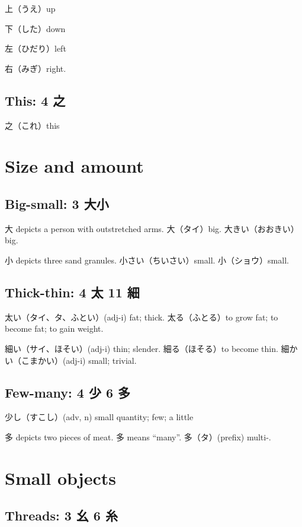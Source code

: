 上（うえ）up

下（した）down

左（ひだり）left

右（みぎ）right.

\subsection{This: 4 之}

之（これ）this

\section{Size and amount}

\subsection{Big-small: 3 大小}

大 depicts a person with outstretched arms.
大（タイ）big.
大きい（おおきい）big.

小 depicts three sand granules.
小さい（ちいさい）small.
小（ショウ）small.

\subsection{Thick-thin: 4 太 11 細}

太い（タイ、タ、ふとい）(adj-i) fat; thick.
太る（ふとる）to grow fat; to become fat; to gain weight.

細い（サイ、ほそい）(adj-i) thin; slender.
細る（ほそる）to become thin.
細かい（こまかい）(adj-i) small; trivial.

\subsection{Few-many: 4 少 6 多}

少し（すこし）(adv, n) small quantity; few; a little

多 depicts two pieces of meat.
多 means ``many''.
多（タ）(prefix) multi-.

\section{Small objects}

\subsection{Threads: 3 幺 6 糸}


